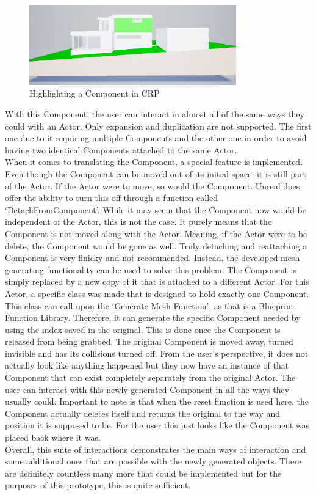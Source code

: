 \begin{figure}[htpb]
	\centering
	\includegraphics[width=0.8\textwidth]{fig/ComponentHighlight.png}
	\caption[Highlighting a Component in CRP]{Highlighting a Component in CRP\protect}
	\label{fig:ComponentHighlight}
\end{figure}

With this Component, the user can interact in almost all of the same ways they could with an Actor. Only expansion and duplication are not supported. The first one due to it requiring multiple Components and the other one in order to avoid having two identical Components attached to the same Actor.\\
When it comes to translating the Component, a special feature is implemented. Even though the Component can be moved out of its initial space, it is still part of the Actor. If the Actor were to move, so would the Component. Unreal does offer the ability to turn this off through a function called `DetachFromComponent'. While it may seem that the Component now would be independent of the Actor, this is not the case. It purely means that the Component is not moved along with the Actor. Meaning, if the Actor were to be delete, the Component would be gone as well. Truly detaching and reattaching a Component is very finicky and not recommended. Instead, the developed mesh generating functionality can be used to solve this problem. The Component is simply replaced by a new copy of it that is attached to a different Actor. For this Actor, a specific class was made that is designed to hold exactly one Component. This class can call upon the `Generate Mesh Function', as that is a Blueprint Function Library. Therefore, it can generate the specific Component needed by using the index saved in the original. This is done once the Component is released from being grabbed. The original Component is moved away, turned invisible and has its collisions turned off. From the user's perspective, it does not actually look like anything happened but they now have an instance of that Component that can exist completely separately from the original Actor. The user can interact with this newly generated Component in all the ways they usually could. Important to note is that when the reset function is used here, the Component actually deletes itself and returns the original to the way and position it is supposed to be. For the user this just looks like the Component was placed back where it was.\\
Overall, this suite of interactions demonstrates the main ways of interaction and some additional ones that are possible with the newly generated objects. There are definitely countless many more that could be implemented but for the purposes of this prototype, this is quite sufficient. 